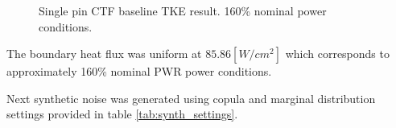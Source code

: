 \begin{figure}[H]%
    \centering
    \hspace*{-1.0em}%
    \caption[Single pin CTF baseline TKE result.  160\% nominal power conditions.]{Single pin CTF baseline TKE result.  160\% nominal power conditions.}%
    \label{fig:ctf_tke_orig}%
\end{figure}


The boundary heat flux was uniform at $85.86 [W/cm^2]$ which corresponds to approximately 160\% nominal PWR power conditions.

Next synthetic noise was generated using copula and marginal distribution settings provided in table \ref{tab:synth_settings}. %

